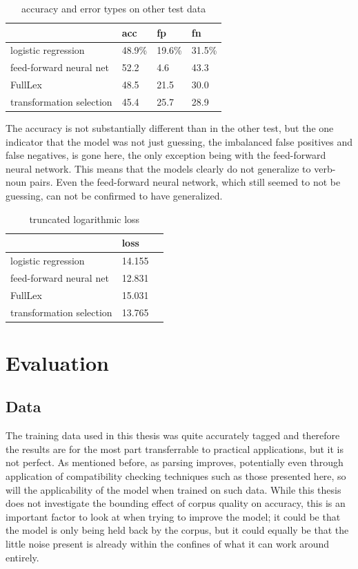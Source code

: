 \documentclass[a4paper, 12pt]{article}
\begin{document}
\begin{table}[]
	\centering
	\begin{tabular}{l|lll}
		                         & acc      & fp       & fn        \\ \hline
		logistic regression      & 48.9\%   & 19.6\%   & 31.5\%    \\
		feed-forward neural net  & 52.2     & 4.6      & 43.3      \\
		FullLex                  & 48.5     & 21.5     & 30.0      \\
		transformation selection & 45.4     & 25.7     & 28.9
	\end{tabular}
	\caption{accuracy and error types on other test data}
	\label{accuracy-vn-na}
\end{table}

The accuracy is not substantially different than in the other test, but the one indicator that the model was not just guessing, the imbalanced false positives and false negatives, is gone here, the only exception being with the feed-forward neural network. This means that the models clearly do not generalize to verb-noun pairs. Even the feed-forward neural network, which still seemed to not be guessing, can not be confirmed to have generalized.

\begin{table}[]
	\centering
	\begin{tabular}{l|l|l}
		                         & loss      \\ \hline
		logistic regression      & 14.155    \\
		feed-forward neural net  & 12.831    \\
		FullLex                  & 15.031    \\
		transformation selection & 13.765
	\end{tabular}
	\caption{truncated logarithmic loss}
	\label{loss-vn-na}
\end{table}


\section{Evaluation}

\subsection{Data}
The training data used in this thesis was quite accurately tagged and therefore the results are for the most part transferrable to practical applications, but it is not perfect. As mentioned before, as parsing improves, potentially even through application of compatibility checking techniques such as those presented here, so will the applicability of the model when trained on such data. While this thesis does not investigate the bounding effect of corpus quality on accuracy, this is an important factor to look at when trying to improve the model; it could be that the model is only being held back by the corpus, but it could equally be that the little noise present is already within the confines of what it can work around entirely.
\end{document}
